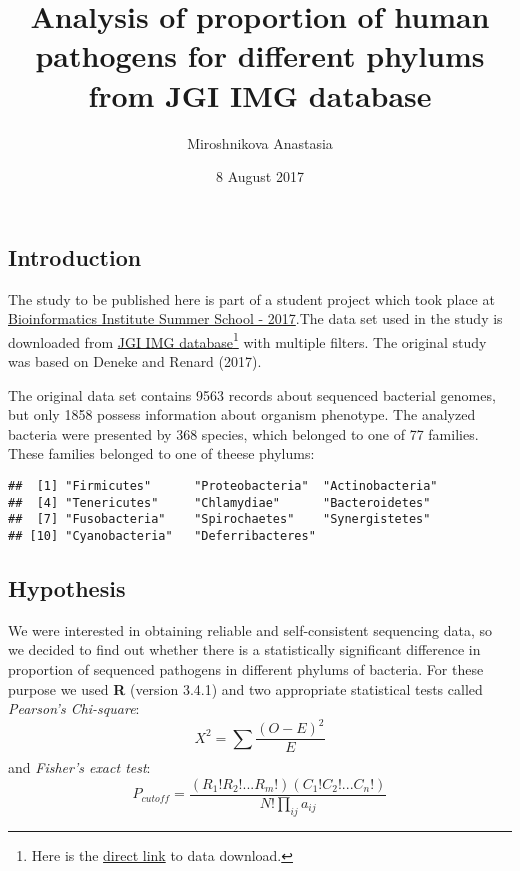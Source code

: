 \documentclass[]{article}
\title{Analysis of proportion of human pathogens for different phylums from JGI
IMG database}
\author{Miroshnikova Anastasia}
\date{8 August 2017}
\let\rmarkdownfootnote\footnote%
\def\footnote{\protect\rmarkdownfootnote}
\begin{document}
\maketitle

{
\hypersetup{linkcolor=black}
\setcounter{tocdepth}{2}
\tableofcontents
}
\subsection{Introduction}\label{introduction}

The study to be published here is part of a student project which took
place at
\href{http://bioinformaticsinstitute.ru/summer2017}{Bioinformatics
Institute Summer School - 2017}.The data set used in the study is
downloaded from \href{https://img.jgi.doe.gov/cgi-bin/m/main.cgi}{JGI
IMG database}\footnote{Here is the
  \href{https://raw.githubusercontent.com/Miffka/RAnalysis2FinalTask/master/IMG_all-more\%2Bpathog.xls}{direct
  link} to data download.} with multiple filters. The original study was
based on Deneke and Renard (2017).

The original data set contains 9563 records about sequenced bacterial
genomes, but only 1858 possess information about organism phenotype. The
analyzed bacteria were presented by 368 species, which belonged to one
of 77 families. These families belonged to one of theese phylums:

\begin{verbatim}
##  [1] "Firmicutes"      "Proteobacteria"  "Actinobacteria" 
##  [4] "Tenericutes"     "Chlamydiae"      "Bacteroidetes"  
##  [7] "Fusobacteria"    "Spirochaetes"    "Synergistetes"  
## [10] "Cyanobacteria"   "Deferribacteres"
\end{verbatim}

\subsection{Hypothesis}\label{hypothesis}

We were interested in obtaining reliable and self-consistent sequencing
data, so we decided to find out whether there is a statistically
significant difference in proportion of sequenced pathogens in different
phylums of bacteria. For these purpose we used \textbf{R} (version
3.4.1) and two appropriate statistical tests called \emph{Pearson's
Chi-square}: \[X^2 = \sum_{}{}\frac{(O - E)^2}{E} \] and \emph{Fisher's
exact test}:
\[P_{cutoff} = \frac{(R_1!R_2!...R_m!)(C_1!C_2!...C_n!)}{N!\prod_{ij}^{}a_{ij}} \]
\end{document}
